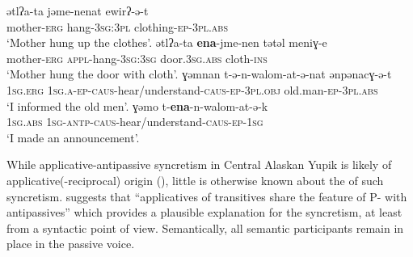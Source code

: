 \ea {} \citep[212, 215f.]{dunn:1999}
\ea\label{ex:Chukchi:hang:a}
	\gll	ətlʔa-ta jəme-nenat ewirʔ-ə-t \\
			mother-\textsc{erg} hang-\textsc{3sg:3pl} clothing-\textsc{ep-3pl.abs} \\
	\glt	‘Mother hung up the clothes’.
\ex\label{ex:Chukchi:hang:b}
	\gll	ətlʔa-ta \textbf{ena}-jme-nen tətəl meniɣ-e \\
			mother-\textsc{erg} \textsc{appl}-hang-\textsc{3sg:3sg} door.\textsc{3sg.abs} cloth-\textsc{ins} \\
	\glt	‘Mother hung the door with cloth’.
\ex\label{ex:Chukchi:inform:a}
	\gll	ɣəmnan t-ə-n-walom-at-ə-nat ənpənacɣ-ə-t \\
			\textsc{1sg.erg} \textsc{1sg.a-ep-caus}-hear/understand-\textsc{caus-ep-3pl.obj} old.man-\textsc{ep-3pl.abs} \\
	\glt	‘I informed the old men’.
\ex\label{ex:Chukchi:inform:b}
	\gll	ɣəmo t-\textbf{ena}-n-walom-at-ə-k \\
			\textsc{1sg.abs} \textsc{1sg-antp-caus}-hear/understand-\textsc{caus-ep-1sg} \\
	\glt	‘I made an announcement’.
	\z 
\z

While applicative-antipassive syncretism in Central Alaskan Yupik is likely of applicative(-reciprocal) origin (), little is otherwise known about the  of such syncretism. \citet[24]{malchukov:2017} suggests that “applicatives of transitives share the feature of P- with antipassives” which provides a plausible explanation for the syncretism, at least from a syntactic point of view. Semantically, all semantic participants remain in place in the passive voice.

